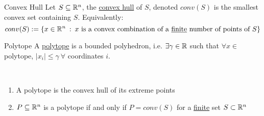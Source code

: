 \begin{definition}{Convex Hull}{}
    Let $S \subseteq \mathbb{R}^n$, the \underline{convex hull} of $S$, denoted $conv(S)$ is the smallest convex set containing $S$. Equivalently:
    \begin{equation*}
        conv(S) := \{x \in \mathbb{R}^n \::\: x \text{ is a convex combination of a \underline{finite} number of points of } S\}
    \end{equation*}
\end{definition}

\begin{definition}{Polytope}{}
    A \underline{polytope} is a bounded polyhedron, i.e. $\exists \gamma \in \mathbb{R}$ such that $\forall x \in$ polytope, $|x_i| \leq \gamma \: \forall$ coordinates $i$.
\end{definition}

\begin{remark}~
    \begin{enumerate}
        \item A polytope is the convex hull of its extreme points
        \item $P \subseteq \mathbb{R}^n$ is a polytope if and only if $P = conv(S)$ for a \underline{finite} set $S \subset \mathbb{R}^n$
    \end{enumerate}
\end{remark}